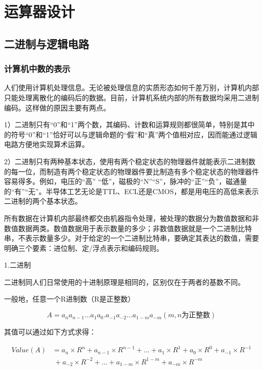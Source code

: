 \documentclass[]{ctexbook}
\begin{document}
\newpage

\hypertarget{ux8fd0ux7b97ux5668ux8bbeux8ba1}{%
\chapter{运算器设计}\label{ux8fd0ux7b97ux5668ux8bbeux8ba1}}

\hypertarget{ux4e8cux8fdbux5236ux4e0eux903bux8f91ux7535ux8def}{%
\section{二进制与逻辑电路}\label{ux4e8cux8fdbux5236ux4e0eux903bux8f91ux7535ux8def}}

\hypertarget{sec-number-presentation}{%
\subsection{计算机中数的表示}\label{sec-number-presentation}}

人们使用计算机处理信息。无论被处理信息的实质形态如何千差万别，计算机内部只能处理离散化的编码后的数据。目前，计算机系统内部的所有数据均采用二进制编码。这样做的原因主要有两点。

1）二进制只有``0''和``1''两个数，其编码、计数和运算规则都很简单，特别是其中的符号``0''和``1''恰好可以与逻辑命题的``假''和``真''两个值相对应，因而能通过逻辑电路方便地实现算术运算。

2）二进制只有两种基本状态，使用有两个稳定状态的物理器件就能表示二进制数的每一位，而制造有两个稳定状态的物理器件要比制造有多个稳定状态的物理器件容易得多。例如，电压的``高'' ``低''，磁极的``N''``S''，脉冲的``正''``负''，磁通量的``有''``无''。半导体工艺无论是TTL、ECL还是CMOS，都是用电压的高低来表示二进制的两个基本状态。

所有数据在计算机内部最终都交由机器指令处理，被处理的数据分为数值数据和非数值数据两类。数值数据用于表示数量的多少；非数值数据就是一个二进制比特串，不表示数量多少。对于给定的一个二进制比特串，要确定其表达的数值，需要明确三个要素：进位制、定/浮点表示和编码规则。

1.二进制

二进制同人们日常使用的十进制原理是相同的，区别仅在于两者的基数不同。

一般地，任意一个R进制数（R是正整数）

\[A=a_{n}a_{n-1}\ldots a_{1}a_{0}.a_{-1}a_{-2}\ldots a_{1-m}a_{-m} (m,n为正整数)\]

其值可以通过如下方式求得：

\[\begin{aligned}Value(A)&=a_{n}\times R^{n}+a_{n-1}\times R^{n-1}+\ldots +a_{1}\times R^{1}+a_{0}\times R^{0}+a_{-1}\times R^{-1}\\ &\ +a_{-2}\times R^{-2}+\ldots +a_{1-m}\times R^{1-m}+a_{-m}\times R^{-m}\end{aligned}\]
\end{document}
